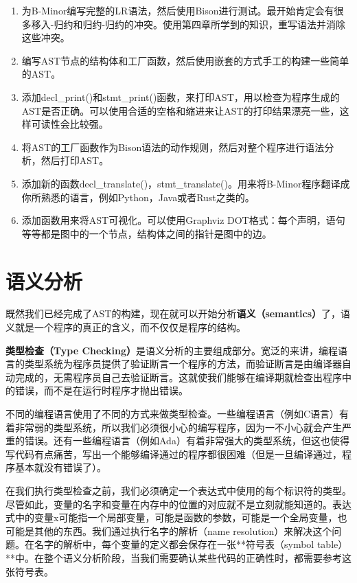 \documentclass[cn,11pt,chinese]{elegantbook}
\begin{document}
\begin{enumerate}
  \item 为B-Minor编写完整的LR语法，然后使用Bison进行测试。最开始肯定会有很多移入-归约和归约-归约的冲突。使用第四章所学到的知识，重写语法并消除这些冲突。
  \item 编写AST节点的结构体和工厂函数，然后使用嵌套的方式手工的构建一些简单的AST。
  \item 添加decl\_print()和stmt\_print()函数，来打印AST，用以检查为程序生成的AST是否正确。可以使用合适的空格和缩进来让AST的打印结果漂亮一些，这样可读性会比较强。
  \item 将AST的工厂函数作为Bison语法的动作规则，然后对整个程序进行语法分析，然后打印AST。
  \item 添加新的函数decl\_translate()，stmt\_translate()。用来将B-Minor程序翻译成你所熟悉的语言，例如Python，Java或者Rust之类的。
  \item 添加函数用来将AST可视化。可以使用Graphviz DOT格式：每个声明，语句等等都是图中的一个节点，结构体之间的指针是图中的边。
\end{enumerate}

\chapter{语义分析}

既然我们已经完成了AST的构建，现在就可以开始分析\textbf{语义（semantics）}了，语义就是一个程序的真正的含义，而不仅仅是程序的结构。

\textbf{类型检查（Type Checking）}是语义分析的主要组成部分。宽泛的来讲，编程语言的类型系统为程序员提供了验证断言一个程序的方法，而验证断言是由编译器自动完成的，无需程序员自己去验证断言。这就使我们能够在编译期就检查出程序中的错误，而不是在运行时程序才抛出错误。

不同的编程语言使用了不同的方式来做类型检查。一些编程语言（例如C语言）有着非常弱的类型系统，所以我们必须很小心的编写程序，因为一不小心就会产生严重的错误。还有一些编程语言（例如Ada）有着非常强大的类型系统，但这也使得写代码有点痛苦，写出一个能够编译通过的程序都很困难（但是一旦编译通过，程序基本就没有错误了）。

在我们执行类型检查之前，我们必须确定一个表达式中使用的每个标识符的类型。尽管如此，变量的名字和变量在内存中的位置的对应就不是立刻就能知道的。表达式中的变量x可能指一个局部变量，可能是函数的参数，可能是一个全局变量，也可能是其他的东西。我们通过执行名字的解析（name resolution）来解决这个问题。在名字的解析中，每个变量的定义都会保存在一张**符号表（symbol table）**中。在整个语义分析阶段，当我们需要确认某些代码的正确性时，都需要参考这张符号表。
\end{document}
